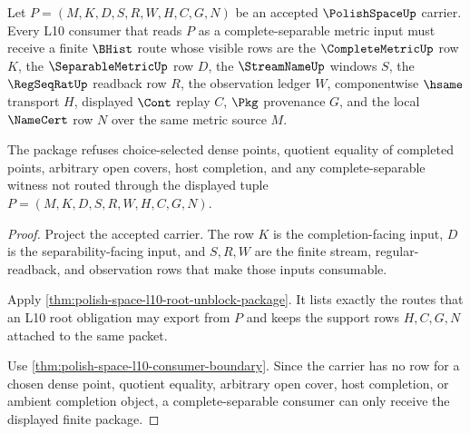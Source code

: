 \begin{theorem}
\label{thm:polish-space-l10-complete-separable-consumer-package}
Let $P=(M,K,D,S,R,W,H,C,G,N)$ be an accepted $\PolishSpaceUp$ carrier. Every L10 consumer that reads $P$ as a complete-separable metric input must receive a finite $\BHist$ route whose visible rows are the $\CompleteMetricUp$ row $K$, the $\SeparableMetricUp$ row $D$, the $\StreamNameUp$ windows $S$, the $\RegSeqRatUp$ readback row $R$, the observation ledger $W$, componentwise $\hsame$ transport $H$, displayed $\Cont$ replay $C$, $\Pkg$ provenance $G$, and the local $\NameCert$ row $N$ over the same metric source $M$.

The package refuses choice-selected dense points, quotient equality of completed points, arbitrary open covers, host completion, and any complete-separable witness not routed through the displayed tuple $P=(M,K,D,S,R,W,H,C,G,N)$.
\end{theorem}
\begin{proof}
Project the accepted carrier. The row $K$ is the completion-facing input, $D$ is the separability-facing input, and $S,R,W$ are the finite stream, regular-readback, and observation rows that make those inputs consumable.

Apply \autoref{thm:polish-space-l10-root-unblock-package}. It lists exactly the routes that an L10 root obligation may export from $P$ and keeps the support rows $H,C,G,N$ attached to the same packet.

Use \autoref{thm:polish-space-l10-consumer-boundary}. Since the carrier has no row for a chosen dense point, quotient equality, arbitrary open cover, host completion, or ambient completion object, a complete-separable consumer can only receive the displayed finite package.
\end{proof}

